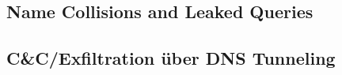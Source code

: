 \begin{comment}
* Unbemerkte übernehme von Domänen möglich
* Komplimitierung von Stakeholder-Diensten möglich
  * Bei Websites  (HTTP od. uralt Browser mit Mixed Active Content) führt die komprimitierung eines einzigen Ressourcenservers zum Kompromittierung der gesamten Seite: XSS wird einfach möglich wenn z.B. eine JS-Datei eines Werbeanbieters in die Seite geladen werden kann.
  * Wenn eine einzige aktive Ressource über http nachgeladen wird oder für TLS Attacken (Poodle, ) anfällig ist, kann die seite und somit der client angegriffen werden.
* Bei nicht verschüsselten Netzwerkprotokollen (plain SMTP/POP3/IMAP, FTP, MQTT) kann die Verbindung vollständig übernommen werden.
* In jedem Fall sorgt eine erfolgreiche Attacke zum Übergang der Verfügbarkeitskontrolle an den Angreifer (bis zum Erkennen das Problems und entfernen der eingeschläuschten Einträge)
\end{comment}

\subsection{Name Collisions and Leaked Queries} 

\begin{comment}
* Durch eigene interne TLDs (z.B. .local) kann es zu Kollisionen im globalen Namespace kommen (new TLDs).
* Mögliche Kollisionen können bewusst ausgenutzt werden.
* Durch falsch/schlecht konfigurierte DNS-Resolver können interne Anfragen zu externen DNS-Servern getragen werden -> Information Disclousure
* Speziell bei "home-use" und ohne "LockDown" kann durch lokale Proxies und Resolver von "leakage" betroffen sein. Auch BYOD-Geräte speziell gefährdet wenn durch falsche Konfiguration DNS-Anfragen zum Auflösen internen Ressourcen an externe DNS-Server gestellt werden.
\end{comment}

\subsection{C&C/Exfiltration über DNS Tunneling}

\begin{comment}
* Mit allen "offenen" resolvern nutzbar
* Bei "best-practice"-Einstellungen des resolvers sehr langsam
* Nicht einfach zu erkennen
* Für sehr kleine Datenmengen durchaus zuverlässig (C&C)
* KillChain: Data Exfiltration, Controll
\end{comment}

